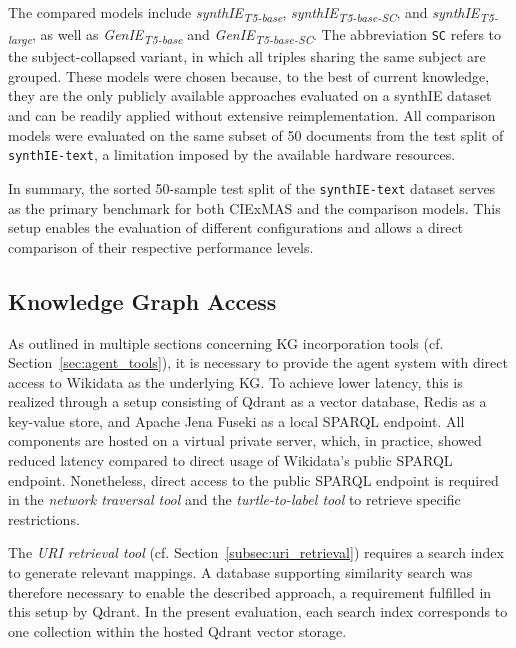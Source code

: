 \documentclass[a4paper,oneside,bibliography=totoc]{scrbook}
\begin{document}
The compared models include \textit{synthIE\textsubscript{T5-base}}, \textit{synthIE\textsubscript{T5-base-SC}}, and \textit{synthIE\textsubscript{T5-large}}, as well as \textit{GenIE\textsubscript{T5-base}} and \textit{GenIE\textsubscript{T5-base-SC}}. The abbreviation \texttt{SC} refers to the subject-collapsed variant, in which all triples sharing the same subject are grouped. These models were chosen because, to the best of current knowledge, they are the only publicly available approaches evaluated on a synthIE dataset and can be readily applied without extensive reimplementation. All comparison models were evaluated on the same subset of 50 documents from the test split of \texttt{synthIE-text}, a limitation imposed by the available hardware resources.

In summary, the sorted 50-sample test split of the \texttt{synthIE-text} dataset serves as the primary benchmark for both CIExMAS and the comparison models. This setup enables the evaluation of different configurations and allows a direct comparison of their respective performance levels.

\subsection{Knowledge Graph Access}
\label{subsec:knowledge_graph_access}

As outlined in multiple sections concerning \ac{KG} incorporation tools (cf. Section~\ref{sec:agent_tools}), it is necessary to provide the agent system with direct access to Wikidata as the underlying \ac{KG}. To achieve lower latency, this is realized through a setup consisting of Qdrant as a vector database, Redis as a key-value store, and Apache Jena Fuseki as a local \ac{SPARQL} endpoint. All components are hosted on a virtual private server, which, in practice, showed reduced latency compared to direct usage of Wikidata’s public \ac{SPARQL} endpoint. Nonetheless, direct access to the public \ac{SPARQL} endpoint is required in the \textit{network traversal tool} and the \textit{turtle-to-label tool} to retrieve specific restrictions.

The \textit{\ac{URI} retrieval tool} (cf. Section~\ref{subsec:uri_retrieval}) requires a search index to generate relevant mappings. A database supporting similarity search was therefore necessary to enable the described approach, a requirement fulfilled in this setup by Qdrant. In the present evaluation, each search index corresponds to one collection within the hosted Qdrant vector storage.
\end{document}
